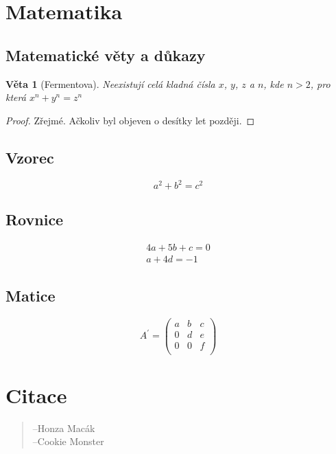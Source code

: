\documentclass[a4paper, 12pt]{article}
\begin{document}
\section{Matematika}
\label{math} %

\subsection{Matematické věty a důkazy}
\label{math:sentences_n_proofs} %
\theoremstyle{plain}
\newtheorem{sentence}{Věta}

\begin{sentence}[Fermentova]
Neexistují celá kladná čísla $x$, $y$, $z$ a $n$, kde $n > 2$, 
pro která $x^{n}+y^{n}=z^{n}$
\end{sentence}

\begin{proof}
Zřejmé. Ačkoliv byl objeven o desítky let později.
\qedhere
\end{proof}

\subsection{Vzorec}
\label{formula} %

\begin{equation}
a^{2} + b^{2} = c^{2}
\end{equation}

\subsection{Rovnice}
\label{equation} %
 
\begin{align*}
4a+5b+c=0 \\
a+4d=-1
\end{align*}


\subsection{Matice}
\label{matrix} %
\[
 A^{'} = \begin{pmatrix}
  a & b & c \\
  0 & d & e \\
  0 & 0 & f \\
	 \end{pmatrix}
\]

\newpage
\section{Citace}
\begin{quote}
\newline
\mbox{}\hfill --Honza Macák\\

\newline
\mbox{}\hfill --Cookie Monster
\end{quote}
\end{document}
